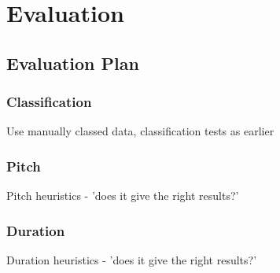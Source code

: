 \chapter{Evaluation}

\section{Evaluation Plan}


\subsection{Classification}
Use manually classed data, classification tests as earlier

\subsection{Pitch}
Pitch heuristics - 'does it give the right results?'

\subsection{Duration}
Duration heuristics - 'does it give the right results?'
